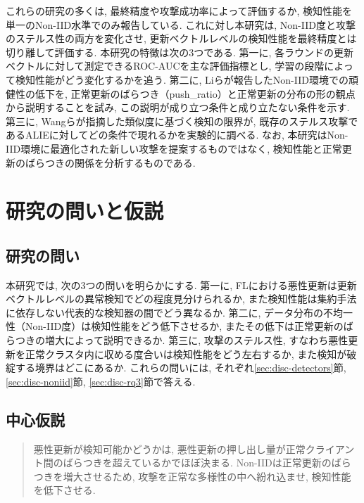 \documentclass[a4j, twocolumn, dvipdfmx]{jsarticle}
\newcommand{\PushRatio}{\textrm{push\_ratio}}
\begin{document}
これらの研究の多くは, 最終精度や攻撃成功率によって評価するか, 検知性能を単一のNon-IID水準でのみ報告している. これに対し本研究は, Non-IID度と攻撃のステルス性の両方を変化させ, 更新ベクトルレベルの検知性能を最終精度とは切り離して評価する. 本研究の特徴は次の3つである. 第一に, 各ラウンドの更新ベクトルに対して測定できるROC-AUCを主な評価指標とし, 学習の段階によって検知性能がどう変化するかを追う. 第二に, Liら\cite{li2023experimental}が報告したNon-IID環境での頑健性の低下を, 正常更新のばらつき（\PushRatio{}）と正常更新の分布の形の観点から説明することを試み, この説明が成り立つ条件と成り立たない条件を示す. 第三に, Wangら\cite{wang2023trust}が指摘した類似度に基づく検知の限界が, 既存のステルス攻撃であるALIEに対してどの条件で現れるかを実験的に調べる. なお, 本研究はNon-IID環境に最適化された新しい攻撃を提案するものではなく, 検知性能と正常更新のばらつきの関係を分析するものである.

\section{研究の問いと仮説}
\label{sec:rq}

\subsection{研究の問い}

本研究では, 次の3つの問いを明らかにする. 第一に, FLにおける悪性更新は更新ベクトルレベルの異常検知でどの程度見分けられるか, また検知性能は集約手法に依存しない代表的な検知器の間でどう異なるか. 第二に, データ分布の不均一性（Non-IID度）は検知性能をどう低下させるか, またその低下は正常更新のばらつきの増大によって説明できるか. 第三に, 攻撃のステルス性, すなわち悪性更新を正常クラスタ内に収める度合いは検知性能をどう左右するか, また検知が破綻する境界はどこにあるか. これらの問いには, それぞれ\ref{sec:disc-detectors}節, \ref{sec:disc-noniid}節, \ref{sec:disc-rq3}節で答える.

\subsection{中心仮説}

\begin{quote}
悪性更新が検知可能かどうかは, 悪性更新の押し出し量が正常クライアント間のばらつきを超えているかでほぼ決まる. Non-IIDは正常更新のばらつきを増大させるため, 攻撃を正常な多様性の中へ紛れ込ませ, 検知性能を低下させる.
\end{quote}
\end{document}

